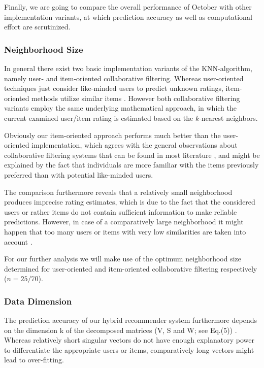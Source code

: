 \documentclass[11pt,letterpaper]{article}
\begin{document}
Finally, we are going to compare the overall performance of October with other implementation variants, at which prediction accuracy as well as computational effort are scrutinized.

\subsubsection{Neighborhood Size}

In general there exist two basic implementation variants of the KNN-algorithm, namely user- and item-oriented collaborative filtering. Whereas user-oriented techniques just consider like-minded users to predict unknown ratings, item-oriented methods utilize similar items \cite{10,13}. However both collaborative filtering variants employ the same underlying mathematical approach, in which the current examined user/item rating is estimated based on the $k$-nearest neighbors.

Obviously our item-oriented approach performs much better than the user-oriented implementation, which agrees with the general observations about collaborative filtering systems that can be found in most literature \cite{8, 2}, and might be explained by the fact that individuals are more familiar with the items previously preferred than with potential like-minded users.

The comparison furthermore reveals that a relatively small neighborhood produces imprecise rating estimates, which is due to the fact that the considered users or rather items do not contain sufficient information to make reliable predictions. However, in case of a comparatively large neighborhood it might happen that too many users or items with very low similarities are taken into account \cite{4, 6}.

For our further analysis we will make use of the optimum neighborhood size determined for user-oriented and item-oriented collaborative filtering respectively ($n = 25/70$).

\subsubsection{Data Dimension}

The prediction accuracy of our hybrid recommender system furthermore depends on the dimension k of the decomposed matrices (V, S and W; see Eq.(5)) \cite{10, 4}. Whereas relatively short singular vectors do not have enough explanatory power to differentiate the appropriate users or items, comparatively long vectors might lead to over-fitting.\\
\end{document}
